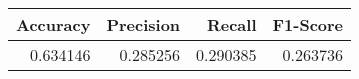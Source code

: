 \begin{tabular}{rrrr}
\toprule
 Accuracy &  Precision &   Recall &  F1-Score \\
\midrule
 0.634146 &   0.285256 & 0.290385 &  0.263736 \\
\bottomrule
\end{tabular}
